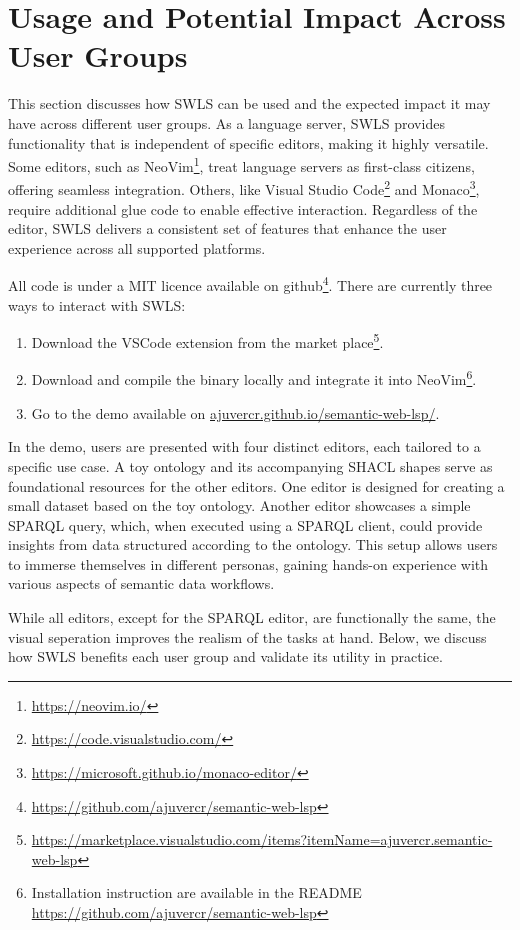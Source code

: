 \section{Usage and Potential Impact Across User Groups}%
\label{sec:usage}

This section discusses how SWLS can be used and the expected impact it may have across different user groups.
As a language server, SWLS provides functionality that is independent of specific editors, making it highly versatile.
Some editors, such as NeoVim\footnote{\url{https://neovim.io/}}, treat language servers as first-class citizens, offering seamless integration.
Others, like Visual Studio Code\footnote{\url{https://code.visualstudio.com/}} and Monaco\footnote{\url{https://microsoft.github.io/monaco-editor/}}, require additional glue code to enable effective interaction.
Regardless of the editor, SWLS delivers a consistent set of features that enhance the user experience across all supported platforms.

All code is under a MIT licence available on github\footnote{\url{https://github.com/ajuvercr/semantic-web-lsp}}.
There are currently three ways to interact with SWLS:
\begin{enumerate}
  \item Download the VSCode extension from the market place\footnote{\url{https://marketplace.visualstudio.com/items?itemName=ajuvercr.semantic-web-lsp}}.
  \item Download and compile the binary locally and integrate it into NeoVim\footnote{Installation instruction are available in the README \url{https://github.com/ajuvercr/semantic-web-lsp}}.
  \item Go to the demo available on \href{https://ajuvercr.github.io/semantic-web-lsp/}{ajuvercr.github.io/semantic-web-lsp/}.
\end{enumerate}

In the demo, users are presented with four distinct editors, each tailored to a specific use case.
A toy ontology and its accompanying SHACL shapes serve as foundational resources for the other editors.
One editor is designed for creating a small dataset based on the toy ontology.
Another editor showcases a simple SPARQL query, which, when executed using a SPARQL client, could provide insights from data structured according to the ontology.
This setup allows users to immerse themselves in different personas, gaining hands-on experience with various aspects of semantic data workflows.

While all editors, except for the SPARQL editor, are functionally the same, 
the visual seperation improves the realism of the tasks at hand.
Below, we discuss how SWLS benefits each user group and validate its utility in practice.

